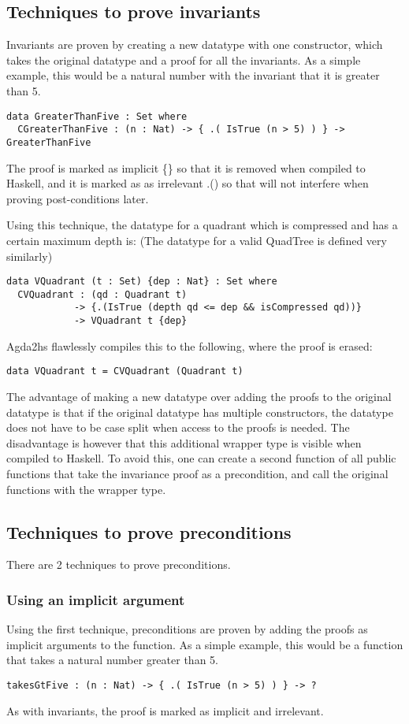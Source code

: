 \subsection{Techniques to prove invariants}
Invariants are proven by creating a new datatype with one constructor, which takes the original datatype and a proof for all the invariants. As a simple example, this would be a natural number with the invariant that it is greater than 5.
\begin{verbatim}
data GreaterThanFive : Set where
  CGreaterThanFive : (n : Nat) -> { .( IsTrue (n > 5) ) } -> GreaterThanFive
\end{verbatim}
The proof is marked as implicit \{\} so that it is removed when compiled to Haskell, and it is marked as as irrelevant .() so that will not interfere when proving post-conditions later. 

Using this technique, the datatype for a quadrant which is compressed and has a certain maximum depth is: (The datatype for a valid QuadTree is defined very similarly)
\begin{verbatim}
data VQuadrant (t : Set) {dep : Nat} : Set where
  CVQuadrant : (qd : Quadrant t) 
            -> {.(IsTrue (depth qd <= dep && isCompressed qd))} 
            -> VQuadrant t {dep}
\end{verbatim}
Agda2hs flawlessly compiles this to the following, where the proof is erased:
\begin{verbatim}
data VQuadrant t = CVQuadrant (Quadrant t)
\end{verbatim}

The advantage of making a new datatype over adding the proofs to the original datatype is that if the original datatype has multiple constructors, the datatype does not have to be case split when access to the proofs is needed. The disadvantage is however that this additional wrapper type is visible when compiled to Haskell. To avoid this, one can create a second function of all public functions that take the invariance proof as a precondition, and call the original functions with the wrapper type. 

\subsection{Techniques to prove preconditions}
There are 2 techniques to prove preconditions.

\subsubsection{Using an implicit argument}
Using the first technique, preconditions are proven by adding the proofs as implicit arguments to the function.
As a simple example, this would be a function that takes a natural number greater than 5.
\begin{verbatim}
takesGtFive : (n : Nat) -> { .( IsTrue (n > 5) ) } -> ?
\end{verbatim}
As with invariants, the proof is marked as implicit and irrelevant. 

